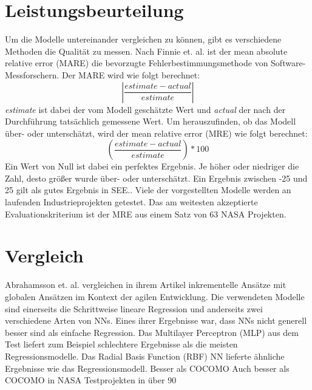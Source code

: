 \section{Leistungsbeurteilung}
Um die Modelle untereinander vergleichen zu können, gibt es verschiedene Methoden die Qualität zu messen. Nach Finnie et. al. ist der mean absolute relative error (MARE) die bevorzugte Fehlerbestimmungsmethode von Software-Messforschern. Der MARE wird wie folgt berechnet:
\begin{equation}
\left|\frac{estimate - actual}{estimate}\right|
\end{equation}
\textit{estimate} ist dabei der vom Modell geschätzte Wert und \textit{actual} der nach der Durchführung tatsächlich gemessene Wert. Um herauszufinden, ob das Modell über- oder unterschätzt, wird der mean relative error (MRE) wie folgt berechnet:
\begin{equation}
\left(\frac{estimate - actual}{estimate}\right)*100
\end{equation}
Ein Wert von Null ist dabei ein perfektes Ergebnis. Je höher oder niedriger die Zahl, desto größer wurde über- oder unterschätzt.\cite{Finnie1996} Ein Ergebnis zwischen -25 und 25 gilt als gutes Ergebnis in SEE.\cite{Abrahamsson2007}. Viele der vorgestellten Modelle werden an laufenden Industrieprojekten getestet. Das am weitesten akzeptierte Evaluationskriterium ist der MRE aus einem Satz von 63 NASA Projekten.\cite{Khalifelu2012}

\section{Vergleich}
Abrahamsson et. al. vergleichen in ihrem Artikel inkrementelle Ansätze mit globalen Ansätzen im Kontext der agilen Entwicklung. Die verwendeten Modelle sind einerseits die Schrittweise lineare Regression und anderseits zwei verschiedene Arten von NNs. Eines ihrer Ergebnisse war, dass NNs nicht generell besser sind als einfache Regression. Das Multilayer Perceptron (MLP) aus dem Test liefert zum Beispiel schlechtere Ergebnisse als die meisten Regressionsmodelle. Das Radial Basis Function (RBF)  NN lieferte ähnliche Ergebnisse wie das Regressionsmodell.\cite{Abrahamsson2007}
Besser als COCOMO\cite{Khalifelu2012} %
Auch besser als COCOMO in NASA Testprojekten in über 90%

